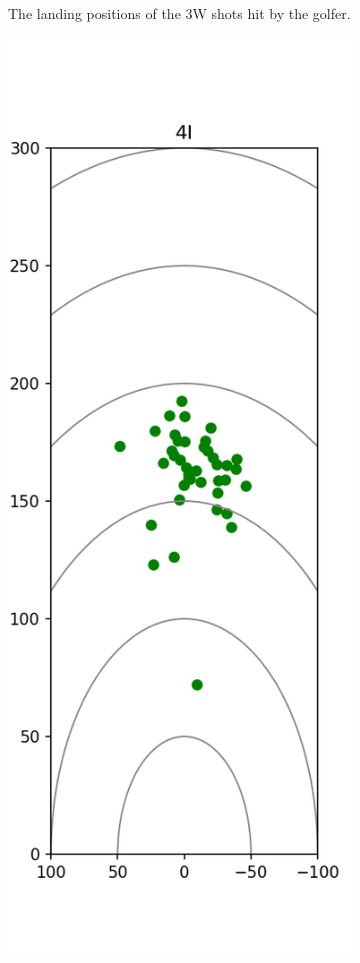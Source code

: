 \documentclass{kththesis}
\begin{document}
\begin{figure}
\begin{subfigure}{0.4\textwidth}
    \caption{The landing positions of the 3W shots hit by the golfer.}
    \label{fig:3W_shots}
    \end{subfigure}
    \begin{subfigure}{0.4\textwidth}
    \centering
    \includegraphics[height=0.4\textheight]{Shots/4I_shots.png} 

\end{subfigure}
\end{figure}
\end{document}
